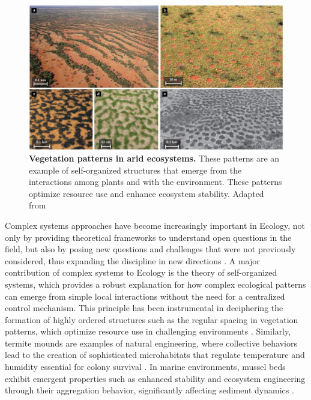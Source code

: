 \begin{figure}[H]
  \centering
  \includegraphics[width=\textwidth]{Figures/vegetation_patterns.jpg}
  \caption[Vegetation patterns in arid
    ecosystems]{\label{fig:vegetation_patterns} \textbf{Vegetation patterns in
      arid ecosystems.} These patterns are an example of self-organized
    structures that emerge from the interactions among plants and with the
    environment. These patterns optimize resource use and enhance ecosystem
    stability. Adapted from \cite{Ehud2019}}
\end{figure}

Complex systems approaches have become increasingly important in Ecology, not
only by providing theoretical frameworks to understand open questions in the
field, but also by posing new questions and challenges that were not previously
considered, thus expanding the discipline in new directions \cite{Milne1998}. A
major contribution of complex systems to Ecology is the theory of
self-organized systems, which provides a robust explanation for how
complex ecological patterns can emerge from simple local interactions without
the need for a centralized control mechanism. This principle has been
instrumental in deciphering the formation of highly ordered structures such as
the regular spacing in vegetation patterns, which optimize resource use in
challenging environments \cite{Tarnita2017}. Similarly, termite mounds are
examples of natural engineering, where collective behaviors lead to the
creation of sophisticated microhabitats that regulate temperature and humidity
essential for colony survival \cite{Heyde2021}. In marine environments, mussel
beds exhibit emergent properties such as enhanced stability and ecosystem
engineering through their aggregation behavior, significantly affecting
sediment dynamics \cite{Koppel2008}.

